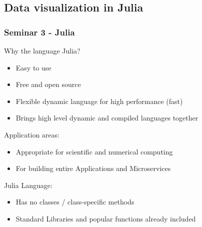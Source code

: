 \documentclass{beamer}
\begin{document}
\subsection{Data visualization in Julia} 
\begin{frame}
\frametitle{Seminar 3 - Julia}
Why the language Julia?
\begin{itemize}
    \item Easy to use
     \item Free and open source
    \item Flexible dynamic language for high performance (fast)
    \item Brings high level dynamic and compiled languages together
   
   
\end{itemize}
Application areas:
\begin{itemize}
    \item Appropriate for scientific and numerical computing
    \item For building entire Applications and Microservices
\end{itemize}
Julia Language:
\begin{itemize}
    \item Has no classes / class-specific methods
    \item Standard Libraries and popular functions already included
\end{itemize}

\end{frame}
\end{document}
